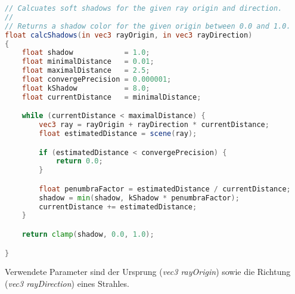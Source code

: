 \begin{minipage}{\linewidth}
\begin{lstlisting}[language=GLSL,caption={Funktion zur Berechnung von
        weichen Schatten  in
        GLSL.},label={alg:glsl_soft_shadows},captionpos=b,emph={calcShadows}]
// Calcuates soft shadows for the given ray origin and direction.
//
// Returns a shadow color for the given origin between 0.0 and 1.0.
float calcShadows(in vec3 rayOrigin, in vec3 rayDirection)
{
    float shadow            = 1.0;
    float minimalDistance   = 0.01;
    float maximalDistance   = 2.5;
    float convergePrecision = 0.000001;
    float kShadow           = 8.0;
    float currentDistance   = minimalDistance;

    while (currentDistance < maximalDistance) {
        vec3 ray = rayOrigin + rayDirection * currentDistance;
        float estimatedDistance = scene(ray);

        if (estimatedDistance < convergePrecision) {
            return 0.0;
        }

        float penumbraFactor = estimatedDistance / currentDistance;
        shadow = min(shadow, kShadow * penumbraFactor);
        currentDistance += estimatedDistance;
    }

    return clamp(shadow, 0.0, 1.0);

}
\end{lstlisting}
\end{minipage}

Verwendete Parameter sind der Ursprung (\textit{vec3 rayOrigin}) sowie
die Richtung (\textit{vec3 rayDirection}) eines Strahles.

